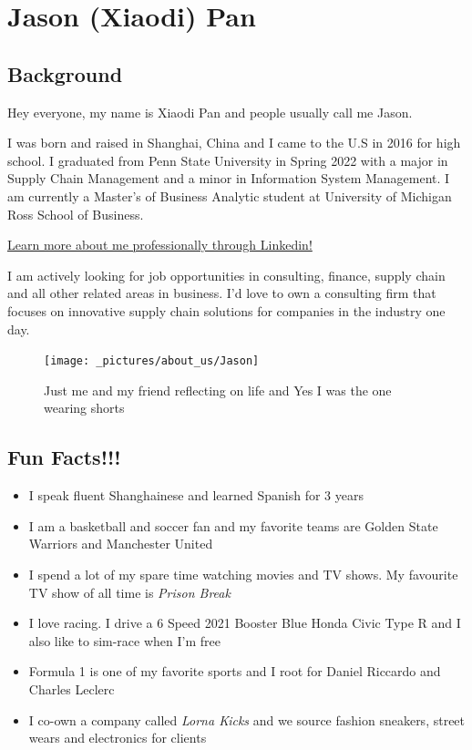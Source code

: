 \documentclass[
]{book}
\providecommand{\tightlist}{%
  \setlength{\itemsep}{0pt}\setlength{\parskip}{0pt}}
\begin{document}
\hypertarget{jason-xiaodi-pan}{%
\section{Jason (Xiaodi) Pan}\label{jason-xiaodi-pan}}

\hypertarget{background}{%
\subsection{Background}\label{background}}

Hey everyone, my name is Xiaodi Pan and people usually call me Jason.

I was born and raised in Shanghai, China and I came to the U.S in 2016 for high school. I graduated from Penn State University in Spring 2022 with a major in Supply Chain Management and a minor in Information System Management. I am currently a Master's of Business Analytic student at University of Michigan Ross School of Business.

\href{https://www.linkedin.com/in/xiaodi-jason-pan/}{Learn more about me professionally through Linkedin!}

I am actively looking for job opportunities in consulting, finance, supply chain and all other related areas in business. I'd love to own a consulting firm that focuses on innovative supply chain solutions for companies in the industry one day.

\begin{figure}
\texttt{[image: \_pictures/about\_us/Jason]} \caption{Just me and my friend reflecting on life and Yes I was the one wearing shorts}\label{fig:pic-Jason}
\end{figure}

\hypertarget{fun-facts}{%
\subsection{Fun Facts!!!}\label{fun-facts}}

\begin{itemize}
\tightlist
\item
  I speak fluent Shanghainese and learned Spanish for 3 years
\item
  I am a basketball and soccer fan and my favorite teams are Golden State Warriors and Manchester United
\item
  I spend a lot of my spare time watching movies and TV shows. My favourite TV show of all time is \emph{Prison Break}
\item
  I love racing. I drive a 6 Speed 2021 Booster Blue Honda Civic Type R and I also like to sim-race when I'm free
\item
  Formula 1 is one of my favorite sports and I root for Daniel Riccardo and Charles Leclerc
\item
  I co-own a company called \emph{Lorna Kicks} and we source fashion sneakers, street wears and electronics for clients
\end{itemize}
\end{document}
